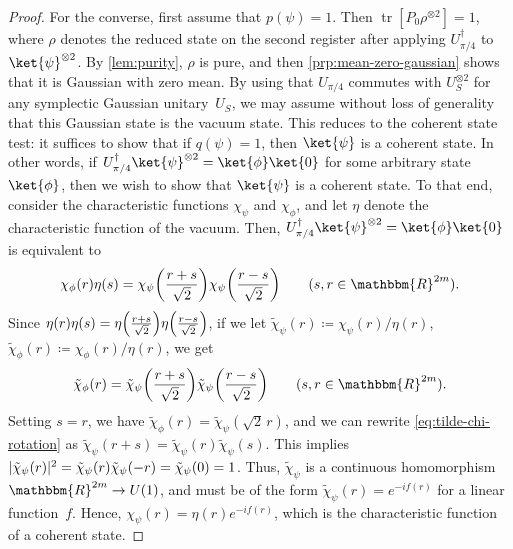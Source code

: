 \documentclass[11pt,a4paper]{article}
\numberwithin{equation}{section}
\newcommand{\ot}{\otimes}
\newcommand{\RR}{\mathbbm{R}}
\newcommand{\1}{\mathbf{1}}
\DeclareMathOperator{\tr}{tr}
\DeclarePairedDelimiter\abs{\lvert}{\rvert}
\begin{document}
\begin{proof}
    For the converse, first assume that $p(\psi)=1$.
    Then $\tr[P_0\rho^{\ot 2}]=1$, where $\rho$ denotes the reduced state on the second register after applying $U_{\pi/4}^\dagger$ to $\ket{\psi}^{\ot 2}$.
    By \cref{lem:purity}, $\rho$ is pure, and then \cref{prp:mean-zero-gaussian} shows that it is Gaussian with zero mean.
    By using that $U_{\pi/4}$ commutes with $U_S^{\ot 2}$ for any symplectic Gaussian unitary~$U_S$, we may assume without loss of generality that this Gaussian state is the vacuum state.
    This reduces to the coherent state test:
    it suffices to show that if $q(\psi) = 1$, then $\ket{\psi}$ is a coherent state.
    In other words, if $U_{\pi/4}^\dagger \ket{\psi}^{\ot 2} = \ket{\phi} \ket{0}$ for some arbitrary state $\ket{\phi}$, then we wish to show that $\ket{\psi}$ is a coherent state.
    To that end, consider the characteristic functions $\chi_\psi$ and $\chi_\phi$, and let $\eta$ denote the characteristic function of the vacuum.
    Then, $U_{\pi/4}^\dagger \ket{\psi}^{\ot 2} = \ket{\phi} \ket{0}$ is equivalent to
        \begin{align*}
        \chi_\phi(r)\eta(s) = \chi_\psi\mleft(\frac{r+s}{\sqrt2}\mright)\chi_\psi\mleft(\frac{r-s}{\sqrt2}\mright) \qquad (s,r \in \RR^{2m}).
    \end{align*}
    Since $\eta(r)\eta(s) = \eta\mleft(\frac{r+s}{\sqrt2}\mright)\eta\mleft(\frac{r-s}{\sqrt2}\mright)$, if we let $\tilde \chi_\psi(r) \coloneqq \chi_\psi(r)/\eta(r)$, $\tilde \chi_\phi(r) \coloneqq \chi_\phi(r)/\eta(r)$, we get
    \begin{align}\label{eq:tilde-chi-rotation}
        \tilde\chi_\phi(r) = \tilde\chi_\psi\mleft(\frac{r+s}{\sqrt2}\mright)\tilde \chi_\psi\mleft(\frac{r-s}{\sqrt2}\mright) \qquad (s,r \in \RR^{2m}).
    \end{align}
    Setting $s=r$, we have $\tilde\chi_\phi(r) = \tilde \chi_\psi(\sqrt2 \, r)$, and we can rewrite \cref{eq:tilde-chi-rotation} as $\tilde \chi_\psi(r + s) = \tilde \chi_\psi(r) \tilde \chi_\psi(s)$.
    This implies $\abs{\tilde \chi_\psi(r)}^2 = \tilde \chi_\psi(r)\tilde \chi_\psi(-r) = \tilde \chi_\psi(0) = 1$.
    Thus, $\tilde \chi_\psi$ is a continuous homomorphism $\RR^{2m} \to U(1)$, and must be of the form $\tilde \chi_\psi(r) = e^{-if(r)}$ for a linear function~$f$.
    Hence, $\chi_\psi(r) = \eta(r) e^{-if(r)}$, which is the characteristic function of a coherent state.
\end{proof}


\end{document}
